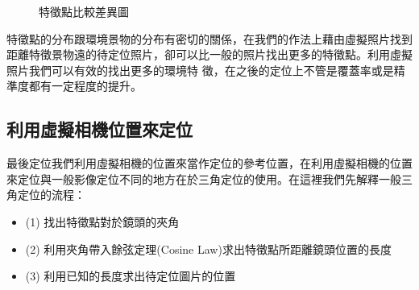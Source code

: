 	\begin{figure}
    	\begin{center}
    	\end{center}
    	\caption{特徵點比較差異圖 }
    	\label{fig:SIFT_Descriptor}
    \end{figure}
	
	特徵點的分布跟環境景物的分布有密切的關係，在我們的作法上藉由虛擬照片找到距離特徵景物遠的待定位照片，卻可以比一般的照片找出更多的特徵點。利用虛擬照片我們可以有效的找出更多的環境特
	徵，在之後的定位上不管是覆蓋率或是精準度都有一定程度的提升。

\subsection{利用虛擬相機位置來定位}

	最後定位我們利用虛擬相機的位置來當作定位的參考位置，在利用虛擬相機的位置來定位與一般影像定位不同的地方在於三角定位的使用。在這裡我們先解釋一般三角定位的流程：
	\begin{itemize}
			\item (1) 找出特徵點對於鏡頭的夾角
    		\item (2) 利用夾角帶入餘弦定理(Cosine Law)求出特徵點所距離鏡頭位置的長度
    		\item (3) 利用已知的長度求出待定位圖片的位置
	\end{itemize}
	
